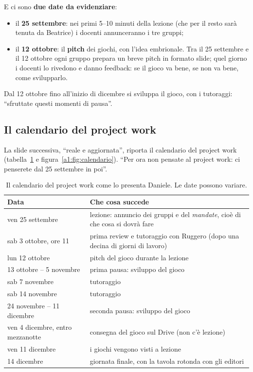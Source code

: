 E ci sono \textbf{due date da evidenziare}:
\begin{itemize}
  \item il \textbf{25 settembre}: nei primi 5--10 minuti della lezione (che per il
        resto sarà tenuta da Beatrice) i docenti annunceranno i tre gruppi;
  \item il \textbf{12 ottobre}: il \textbf{pitch} dei giochi, con l'idea
        embrionale. Tra il 25 settembre e il 12 ottobre ogni gruppo prepara un
        breve pitch in formato slide; quel giorno i docenti lo rivedono e danno
        feedback: se il gioco va bene, se non va bene, come svilupparlo.
\end{itemize}
Dal 12 ottobre fino all'inizio di dicembre si sviluppa il gioco, con i
tutoraggi: ``sfruttate questi momenti di pausa''.

\subsection{Il calendario del project work}

La slide successiva, ``reale e aggiornata'', riporta il calendario del project
work (tabella~\ref{a1:tab:calendario} e figura~\ref{a1:fig:calendario}).
``Per ora non pensate al project work: ci penserete dal 25 settembre in poi''.

\begin{table}[htbp]
\centering
\begin{tabular}{@{}lp{9.2cm}@{}}
\toprule
\textbf{Data} & \textbf{Che cosa succede} \\
\midrule
ven 25 settembre\footnotemark & lezione: annuncio dei gruppi e del
\emph{mandate}, cioè di che cosa si dovrà fare \\
sab 3 ottobre, ore 11 & prima review e tutoraggio con Ruggero (dopo una
decina di giorni di lavoro) \\
lun 12 ottobre & pitch del gioco durante la lezione \\
13 ottobre -- 5 novembre & prima pausa: sviluppo del gioco \\
sab 7 novembre & tutoraggio \\
sab 14 novembre & tutoraggio \\
24 novembre -- 11 dicembre & seconda pausa: sviluppo del gioco \\
ven 4 dicembre, entro mezzanotte & consegna del gioco sul Drive (non c'è
lezione) \\
ven 11 dicembre & i giochi vengono visti a lezione \\
14 dicembre & giornata finale, con la tavola rotonda con gli editori \\
\bottomrule
\end{tabular}
\caption{Il calendario del project work come lo presenta Daniele. Le date
possono variare.}
\label{a1:tab:calendario}
\end{table}

